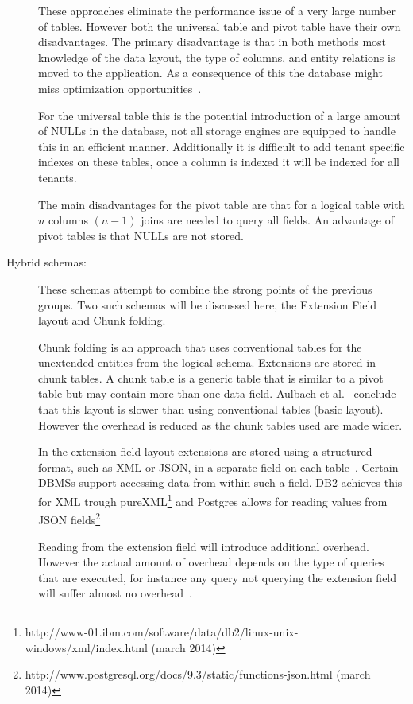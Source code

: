 \begin{description}
		These approaches eliminate the performance issue of a very large number of tables.
		However both the universal table and pivot table have their own disadvantages. 
		The primary disadvantage is that in both methods most knowledge of the data layout, the type of columns, and entity relations is moved to the application.
		As a consequence of this the database might miss optimization opportunities~\cite{schiller2011native}.

		For the universal table this is the potential introduction of a large amount of NULLs in the database, not all storage engines are equipped to handle this in an efficient manner. 
		Additionally it is difficult to add tenant specific indexes on these tables, once a column is indexed it will be indexed for all tenants.

		The main disadvantages for the pivot table are that for a logical table with $n$ columns $(n-1)$ joins are needed to query all fields. 
		An advantage of pivot tables is that NULLs are not stored.
	\item[Hybrid schemas: ] These schemas attempt to combine the strong points of the previous groups. 
		Two such schemas will be discussed here, the Extension Field layout and Chunk folding.

		Chunk folding is an approach that uses conventional tables for the unextended entities from the logical schema.
		Extensions are stored in chunk tables. A chunk table is a generic table that is similar to a pivot table but may contain more than one data field.
		Aulbach et al.~\cite{aulbach2008multi} conclude that this layout is slower than using conventional tables (basic layout). 
		However the overhead is reduced as the chunk tables used are made wider. 

		In the extension field layout extensions are stored using a structured format, such as XML or JSON, in a separate field on each table~\cite{aulbach2009comparison}.
		Certain \acp{DBMS} support accessing data from within such a field. DB2 achieves this for XML trough pureXML\footnote{http://www-01.ibm.com/software/data/db2/linux-unix-windows/xml/index.html (march 2014)} and Postgres allows for reading values from JSON fields\footnote{http://www.postgresql.org/docs/9.3/static/functions-json.html (march 2014)}
		
		Reading from the extension field will introduce additional overhead. However the actual amount of overhead depends on the type of queries that are executed, for instance any query not querying the extension field will suffer almost no overhead~\cite{aulbach2009comparison}.
\end{description}

